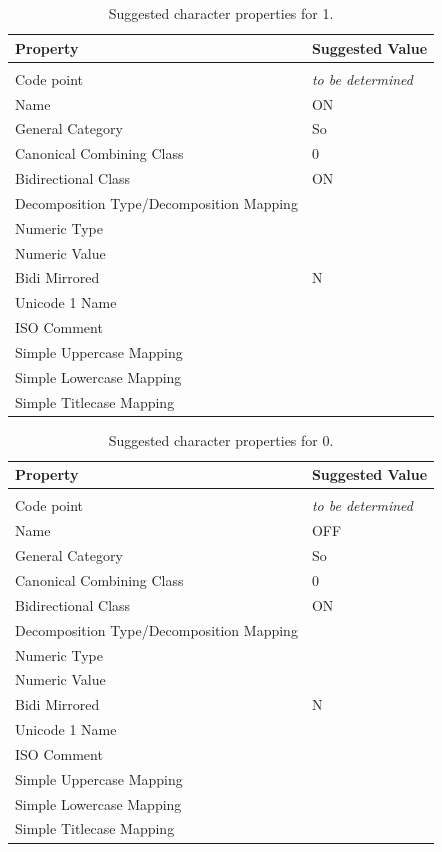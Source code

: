 \documentclass[10pt,a4paper]{article}
\newcommand{\IEC}[1]{{\fontspec{IECpower}#1}}
\begin{document}
\begin{table}[htbp]
	\centering
	\begin{tabular}{ll}
		\textbf{Property} & \textbf{Suggested Value} \\
		\hline \\
		Code point                & \emph{to be determined} \\
		Name                      & ON \\
		General Category          & So \\
		Canonical Combining Class & 0 \\
		Bidirectional Class       & ON \\
		Decomposition Type/Decomposition Mapping \\
		Numeric Type \\
		Numeric Value \\
		Bidi Mirrored             & N \\
		Unicode 1 Name \\
		ISO Comment \\
		Simple Uppercase Mapping \\
		Simple Lowercase Mapping \\
		Simple Titlecase Mapping \\
    \end{tabular}
    \caption{Suggested character properties for \IEC{1}.}
    \label{table:character-properties-1} %
\end{table}

\begin{table}[htbp]
	\centering
	\begin{tabular}{ll}
		\textbf{Property} & \textbf{Suggested Value} \\
		\hline \\
		Code point                & \emph{to be determined} \\
		Name                      & OFF \\
		General Category          & So \\
		Canonical Combining Class & 0 \\
		Bidirectional Class       & ON \\
		Decomposition Type/Decomposition Mapping \\
		Numeric Type \\
		Numeric Value \\
		Bidi Mirrored             & N \\
		Unicode 1 Name \\
		ISO Comment \\
		Simple Uppercase Mapping \\
		Simple Lowercase Mapping \\
		Simple Titlecase Mapping \\
    \end{tabular}
    \caption{Suggested character properties for \IEC{0}.}
    \label{table:character-properties-0} %
\end{table}
\end{document}
